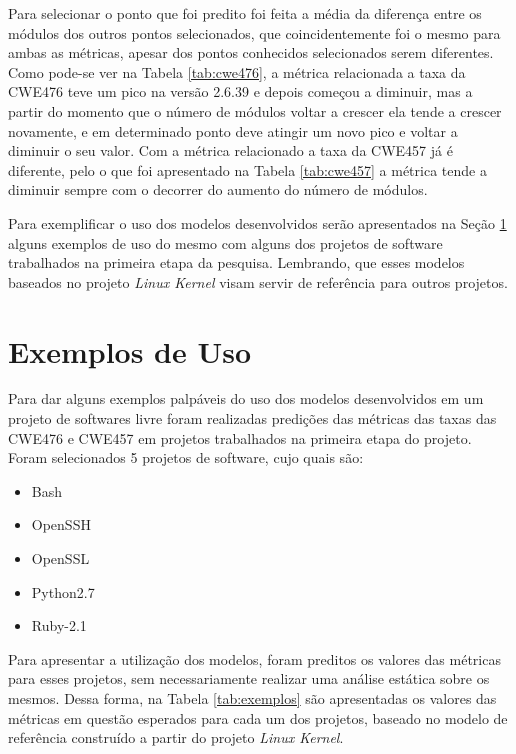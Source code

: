 Para selecionar o ponto que foi predito foi feita a média da diferença entre os
módulos dos outros pontos selecionados, que coincidentemente foi o mesmo para
ambas as métricas, apesar dos pontos conhecidos selecionados serem diferentes.
Como pode-se ver na Tabela \ref{tab:cwe476}, a métrica relacionada a taxa da
CWE476 teve um pico na versão 2.6.39 e depois começou a diminuir, mas a partir do
momento que o número de módulos voltar a crescer ela tende a crescer novamente,
e em determinado ponto deve atingir um novo pico e voltar a diminuir o seu
valor. Com a métrica relacionado a taxa da CWE457 já é diferente, pelo o que foi
apresentado na Tabela \ref{tab:cwe457} a métrica tende a diminuir sempre com o
decorrer do aumento do número de módulos.

Para exemplificar o uso dos modelos desenvolvidos serão apresentados na Seção
\ref{exemplosdeuso} alguns exemplos de uso do mesmo com alguns dos projetos de
software trabalhados na primeira etapa da pesquisa. Lembrando, que esses modelos
baseados no projeto \textit{Linux Kernel} visam servir de referência para outros
projetos.




\section{Exemplos de Uso}\label{exemplosdeuso}

Para dar alguns exemplos palpáveis do uso dos modelos desenvolvidos em um
projeto de softwares livre foram realizadas predições das métricas das taxas das
CWE476 e CWE457 em projetos trabalhados na primeira etapa do projeto. Foram
selecionados 5 projetos de software, cujo quais são:

\begin{itemize}
 \item Bash
 \item OpenSSH
 \item OpenSSL
 \item Python2.7
 \item Ruby-2.1
\end{itemize}

Para apresentar a utilização dos modelos, foram preditos os valores das métricas
para esses projetos, sem necessariamente realizar uma análise estática sobre os
mesmos. Dessa forma, na Tabela \ref{tab:exemplos} são apresentadas os valores
das métricas em questão esperados para cada um dos projetos, baseado no modelo de
referência construído a partir do projeto \textit{Linux Kernel}.

